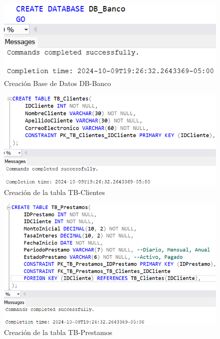 \begin{figure}[H]
  \centering
  \includegraphics[scale = 0.6]{Imagenes/SQL/1.Crear_db/crear_db.png}
  \caption{Creación Base de Datos DB-Banco}
\end{figure}

\begin{figure}[H]
  \centering
  \includegraphics[scale = 0.5]{Imagenes/SQL/2.Crear_tablas/crear_tb_clientes.png}
  \caption{Creación de la tabla TB-Clientes}
\end{figure}

\begin{figure}[H]
  \centering
  \includegraphics[scale = 0.5]{Imagenes/SQL/2.Crear_tablas/crear_tb_prestamos.png}
  \caption{Creación de la tabla TB-Prestamos}
\end{figure}

